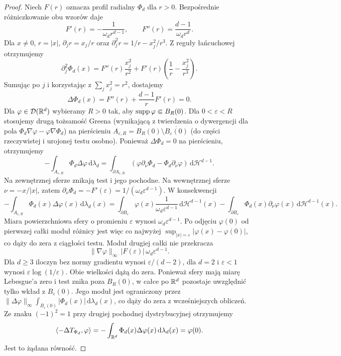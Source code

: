 \begin{proof}
Niech $F(r)$ oznacza profil radialny $\Phi_d$ dla $r>0$.
Bezpośrednie różniczkowanie obu wzorów daje
\[
 F'(r)=-\frac1{\omega_dr^{d-1}},\qquad
 F''(r)=\frac{d-1}{\omega_dr^d}.
\]
Dla $x\ne0$, $r=|x|$,
$\partial_jr=x_j/r$ oraz
$\partial_j^2r=1/r-x_j^2/r^3$.
Z reguły łańcuchowej otrzymujemy
\[
 \partial_j^2\Phi_d(x)
 =F''(r)\frac{x_j^2}{r^2}
 +F'(r)\left(\frac1r-\frac{x_j^2}{r^3}\right).
\]
Sumując po $j$ i korzystając z $\sum_j x_j^2=r^2$,
dostajemy
\[
 \Delta\Phi_d(x)
 =F''(r)+\frac{d-1}{r}F'(r)=0.
\]
Dla $\varphi\in\mathcal D(\mathbb R^d)$ wybieramy $R>0$
tak, aby $\operatorname{supp}\varphi\Subset B_R(0)$.
Dla $0<\varepsilon<R$ stosujemy drugą tożsamość
Greena (wynikającą z twierdzenia o dywergencji
dla pola $\Phi_d\nabla\varphi-\varphi\nabla\Phi_d$) na pierścieniu
$A_{\varepsilon,R}=B_R(0)\setminus\overline{B_\varepsilon(0)}$
(do części rzeczywistej i urojonej testu osobno).
Ponieważ $\Delta\Phi_d=0$ na pierścieniu,
otrzymujemy
\[
 -\int_{A_{\varepsilon,R}}\Phi_d\Delta\varphi
 \,\mathrm d\lambda_d
 =\int_{\partial A_{\varepsilon,R}}
 (\varphi\partial_\nu\Phi_d-\Phi_d\partial_\nu\varphi)
 \,\mathrm d\mathcal H^{d-1}.
\]
Na zewnętrznej sferze znikają test i jego pochodne.
Na wewnętrznej sferze $\nu=-x/|x|$, zatem
$\partial_\nu\Phi_d=-F'(\varepsilon)
=1/(\omega_d\varepsilon^{d-1})$.
W konsekwencji
\[
 -\int_{A_{\varepsilon,R}}\Phi_d(x)\Delta\varphi(x)
 \,\mathrm d\lambda_d(x)
 =\int_{\partial B_\varepsilon}\varphi(x)
 \frac{1}{\omega_d\varepsilon^{d-1}}\,\mathrm d\mathcal H^{d-1}(x)
 -\int_{\partial B_\varepsilon}\Phi_d(x)
 \partial_\nu\varphi(x)\,\mathrm d\mathcal H^{d-1}(x).
\]
Miara powierzchniowa sfery o promieniu $\varepsilon$
wynosi $\omega_d\varepsilon^{d-1}$. Po odjęciu
$\varphi(0)$ od pierwszej całki moduł różnicy
jest więc co najwyżej
$\sup_{|x|=\varepsilon}|\varphi(x)-\varphi(0)|$,
co dąży do zera z ciągłości testu.
Moduł drugiej całki nie przekracza
\[
 \|\nabla\varphi\|_\infty\,
 |F(\varepsilon)|\,\omega_d\varepsilon^{d-1}.
\]
Dla $d\ge3$ iloczyn bez normy gradientu wynosi
$\varepsilon/(d-2)$, dla $d=2$ i $\varepsilon<1$
wynosi $\varepsilon\log(1/\varepsilon)$.
Obie wielkości dążą do zera.
Ponieważ sfery mają miarę Lebesgue'a zero
i test znika poza $B_R(0)$, w całce po $\mathbb R^d$
pozostaje uwzględnić tylko wkład z $B_\varepsilon(0)$.
Jego moduł jest ograniczony przez
$\|\Delta\varphi\|_\infty
\int_{B_\varepsilon(0)}|\Phi_d(x)|\,\mathrm d\lambda_d(x)$,
co dąży do zera z wcześniejszych obliczeń.
Ze znaku $(-1)^2=1$ przy drugiej pochodnej
dystrybucyjnej otrzymujemy
\[
 \langle-\Delta T_{\Phi_d},\varphi\rangle
 =-\int_{\mathbb R^d}\Phi_d(x)\Delta\varphi(x)
 \,\mathrm d\lambda_d(x)=\varphi(0).
\]
Jest to żądana równość.
\end{proof}
